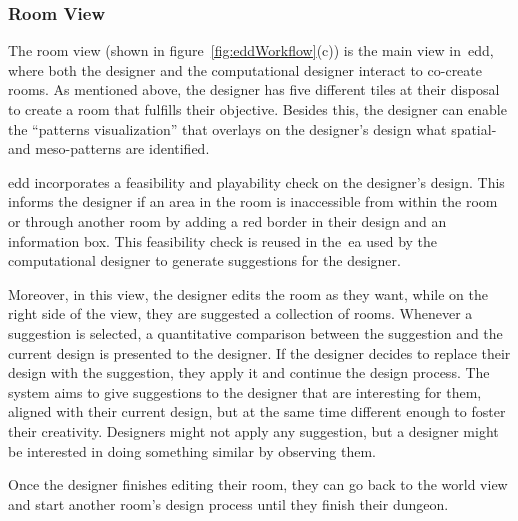 \subsubsection{Room View}

The room view (shown in figure~\ref{fig:eddWorkflow}(c)) is the main view in~\acrshort{edd}, where both the designer and the computational designer interact to co-create rooms. As mentioned above, the designer has five different tiles at their disposal to create a room that fulfills their objective. Besides this, the designer can enable the ``patterns visualization'' that overlays on the designer's design what spatial- and meso-patterns are identified.

\acrshort{edd} incorporates a feasibility and playability check on the designer's design. This informs the designer if an area in the room is inaccessible from within the room or through another room by adding a red border in their design and an information box. This feasibility check is reused in the~\acrshort{ea} used by the computational designer to generate suggestions for the designer. 

Moreover, in this view, the designer edits the room as they want, while on the right side of the view, they are suggested a collection of rooms. Whenever a suggestion is selected, a quantitative comparison between the suggestion and the current design is presented to the designer. If the designer decides to replace their design with the suggestion, they apply it and continue the design process. The system aims to give suggestions to the designer that are interesting for them, aligned with their current design, but at the same time different enough to foster their creativity. Designers might not apply any suggestion, but a designer might be interested in doing something similar by observing them. 

Once the designer finishes editing their room, they can go back to the world view and start another room's design process until they finish their dungeon. 

